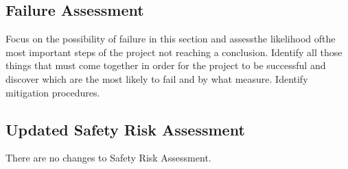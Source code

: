 \documentclass[a4paper,12pt]{article}
\begin{document}
\begin{multicols}{2}
\subsection{Failure Assessment}
Focus on the possibility of failure in this section and assessthe likelihood ofthe most important steps of the project not reaching a conclusion. Identify all those things that must come together in order for the project to be successful and discover which are the most likely to fail and by what measure. Identify mitigation procedures.

\subsection{Updated Safety Risk Assessment}
There are no changes to Safety Risk Assessment.

\end{multicols}
\end{document}
